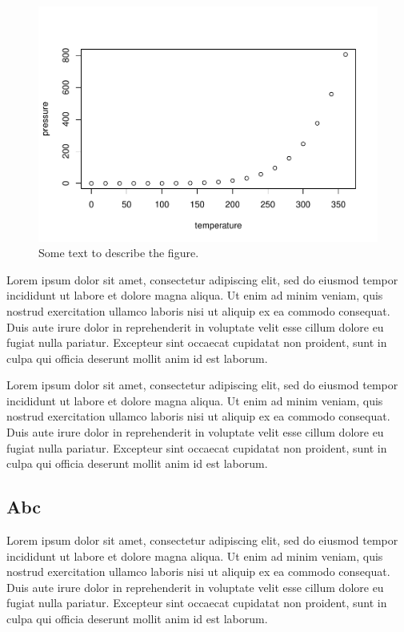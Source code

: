 \documentclass[12pt,a4paper]{article}
\begin{document}
\begin{figure}
\includegraphics{figures/pressure-1.pdf}
\caption{Some text to describe the figure.}
\label{fig:TemperaturePressure}
\end{figure}

Lorem ipsum dolor sit amet, consectetur adipiscing elit, sed do eiusmod
tempor incididunt ut labore et dolore magna aliqua. Ut enim ad minim
veniam, quis nostrud exercitation ullamco laboris nisi ut aliquip ex ea
commodo consequat. Duis aute irure dolor in reprehenderit in voluptate
velit esse cillum dolore eu fugiat nulla pariatur. Excepteur sint
occaecat cupidatat non proident, sunt in culpa qui officia deserunt
mollit anim id est laborum.

Lorem ipsum dolor sit amet, consectetur adipiscing elit, sed do eiusmod
tempor incididunt ut labore et dolore magna aliqua. Ut enim ad minim
veniam, quis nostrud exercitation ullamco laboris nisi ut aliquip ex ea
commodo consequat. Duis aute irure dolor in reprehenderit in voluptate
velit esse cillum dolore eu fugiat nulla pariatur. Excepteur sint
occaecat cupidatat non proident, sunt in culpa qui officia deserunt
mollit anim id est laborum.


\hypertarget{abc}{%
\subsection{Abc}\label{abc}}

Lorem ipsum dolor sit amet, consectetur adipiscing elit, sed do eiusmod
tempor incididunt ut labore et dolore magna aliqua. Ut enim ad minim
veniam, quis nostrud exercitation ullamco laboris nisi ut aliquip ex ea
commodo consequat. Duis aute irure dolor in reprehenderit in voluptate
velit esse cillum dolore eu fugiat nulla pariatur. Excepteur sint
occaecat cupidatat non proident, sunt in culpa qui officia deserunt
mollit anim id est laborum.
\end{document}
